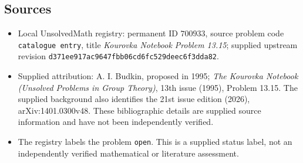 \documentclass[11pt]{article}
\begin{document}
\subsection{Sources}
\begin{itemize}
\item Local UnsolvedMath registry: permanent ID \(700933\), source problem code \texttt{catalogue entry}, title \emph{Kourovka Notebook Problem 13.15}; supplied upstream revision \texttt{d371ee917ac9647fbb06cd6fc529deec6f3dda82}.
\item Supplied attribution: A. I. Budkin, proposed in 1995; \emph{The Kourovka Notebook (Unsolved Problems in Group Theory)}, 13th issue (1995), Problem 13.15. The supplied background also identifies the 21st issue edition (2026), arXiv:1401.0300v48. These bibliographic details are supplied source information and have not been independently verified.
\item The registry labels the problem \texttt{open}. This is a supplied status label, not an independently verified mathematical or literature assessment.
\end{itemize}
\end{document}
